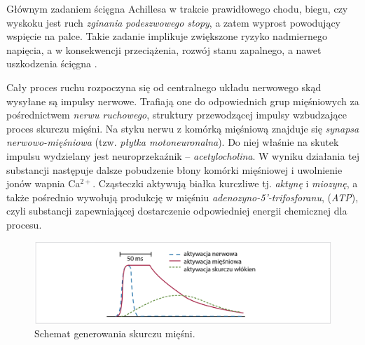 Głównym zadaniem ścięgna Achillesa w trakcie prawidłowego chodu, biegu, czy wyskoku jest ruch \textit{zginania podeszwowego stopy}, a zatem wyprost powodujący wspięcie na palce. Takie zadanie implikuje zwiększone ryzyko nadmiernego napięcia, \linebreak a w konsekwencji przeciążenia, rozwój stanu zapalnego, a nawet uszkodzenia ścięgna \cite{Etiologia}.

Cały proces ruchu rozpoczyna się od centralnego układu nerwowego skąd wysyłane są impulsy nerwowe. Trafiają one do odpowiednich grup mięśniowych za pośrednictwem \textit{nerwu ruchowego}, struktury  przewodzącej impulsy wzbudzające proces skurczu mięśni. Na styku nerwu z komórką mięśniową znajduje się \textit{synapsa nerwowo-mięśniowa} (tzw. \textit{płytka motoneuronalna}). Do niej właśnie na skutek impulsu wydzielany jest neuroprzekaźnik -- \textit{acetylocholina}. W wyniku działania tej substancji następuje dalsze pobudzenie błony komórki mięśniowej i uwolnienie jonów wapnia Ca$^{2+}$. Cząsteczki aktywują białka kurczliwe tj. \textit{aktynę} i \textit{miozynę}, a także pośrednio wywołują produkcję w mięśniu \textit{adenozyno-5'-trifosforanu}, (\textit{ATP}), czyli substancji zapewniającej dostarczenie odpowiedniej energii chemicznej dla procesu.
\begin{figure}[h!]
	\centering
	\includegraphics[width=1\textwidth]{figures/skurcz_miesni.png}
	\caption{Schemat generowania skurczu mięśni.}
	\label{muscle-excitements}
\end{figure}

